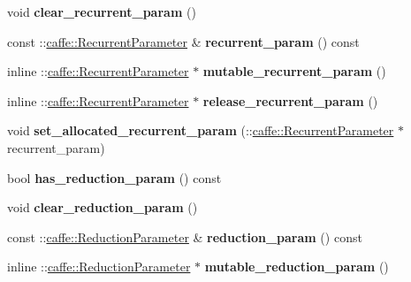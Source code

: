 \begin{DoxyCompactItemize}
void {\bfseries clear\+\_\+recurrent\+\_\+param} ()
\item 
\mbox{\label{classcaffe_1_1_layer_parameter_a9ad8a3f563d3c2484106bfefa26abc28}} 
const \+::\mbox{\hyperlink{classcaffe_1_1_recurrent_parameter}{caffe\+::\+Recurrent\+Parameter}} \& {\bfseries recurrent\+\_\+param} () const
\item 
\mbox{\label{classcaffe_1_1_layer_parameter_aa5ac27224edb26a994095b4ce5a9b7bc}} 
inline \+::\mbox{\hyperlink{classcaffe_1_1_recurrent_parameter}{caffe\+::\+Recurrent\+Parameter}} $\ast$ {\bfseries mutable\+\_\+recurrent\+\_\+param} ()
\item 
\mbox{\label{classcaffe_1_1_layer_parameter_a9f6ff1093ccf02b9c85e1b6156a1b86b}} 
inline \+::\mbox{\hyperlink{classcaffe_1_1_recurrent_parameter}{caffe\+::\+Recurrent\+Parameter}} $\ast$ {\bfseries release\+\_\+recurrent\+\_\+param} ()
\item 
\mbox{\label{classcaffe_1_1_layer_parameter_a1b661a426e0b0e85becc3407dd0cd4a4}} 
void {\bfseries set\+\_\+allocated\+\_\+recurrent\+\_\+param} (\+::\mbox{\hyperlink{classcaffe_1_1_recurrent_parameter}{caffe\+::\+Recurrent\+Parameter}} $\ast$recurrent\+\_\+param)
\item 
\mbox{\label{classcaffe_1_1_layer_parameter_ae0542a2f20dec4af743a6673790809e9}} 
bool {\bfseries has\+\_\+reduction\+\_\+param} () const
\item 
\mbox{\label{classcaffe_1_1_layer_parameter_a7681bbbd117f3fb3079c35bd915fc158}} 
void {\bfseries clear\+\_\+reduction\+\_\+param} ()
\item 
\mbox{\label{classcaffe_1_1_layer_parameter_a0605808bb3d32a1c0d774eebd1efa34a}} 
const \+::\mbox{\hyperlink{classcaffe_1_1_reduction_parameter}{caffe\+::\+Reduction\+Parameter}} \& {\bfseries reduction\+\_\+param} () const
\item 
\mbox{\label{classcaffe_1_1_layer_parameter_a441ec2c33033486ee0ff4679695495c7}} 
inline \+::\mbox{\hyperlink{classcaffe_1_1_reduction_parameter}{caffe\+::\+Reduction\+Parameter}} $\ast$ {\bfseries mutable\+\_\+reduction\+\_\+param} ()

\end{DoxyCompactItemize}
